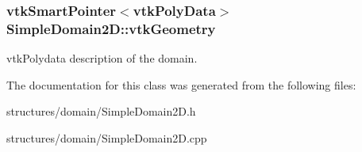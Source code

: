 \subsubsection[{\texorpdfstring{vtk\+Geometry}{vtkGeometry}}]{\setlength{\rightskip}{0pt plus 5cm}vtk\+Smart\+Pointer$<$vtk\+Poly\+Data$>$ Simple\+Domain2\+D\+::vtk\+Geometry\hspace{0.3cm}{\ttfamily [private]}}\hypertarget{class_simple_domain2_d_a2acccf092aaaccfc4fabcd7668a4cc32}{}\label{class_simple_domain2_d_a2acccf092aaaccfc4fabcd7668a4cc32}
vtk\+Polydata description of the domain. 

The documentation for this class was generated from the following files\+:\begin{DoxyCompactItemize}
\item 
structures/domain/Simple\+Domain2\+D.\+h\item 
structures/domain/Simple\+Domain2\+D.\+cpp\end{DoxyCompactItemize}
